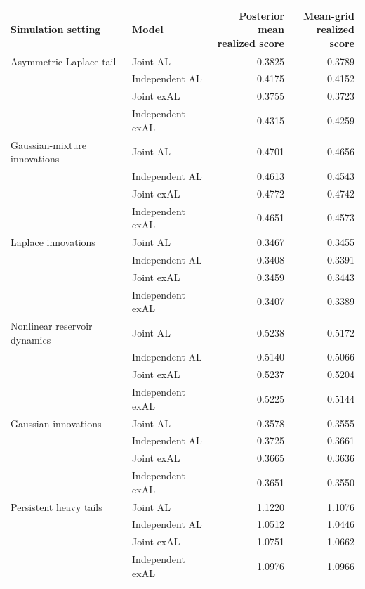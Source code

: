 \begin{table}[p]
\centering
\footnotesize
\setlength{\tabcolsep}{3pt}
\renewcommand{\arraystretch}{1.08}
\begin{tabular}{@{}>{\raggedright\arraybackslash}p{}>{\raggedright\arraybackslash}p{}rr@{}}
\toprule
Simulation setting & Model & \shortstack{Posterior mean\\realized score} & \shortstack{Mean-grid\\realized score} \\
\midrule
Asymmetric-Laplace tail & Joint AL & 0.3825 & 0.3789 \\
 & Independent AL & 0.4175 & 0.4152 \\
 & Joint exAL & 0.3755 & 0.3723 \\
 & Independent exAL & 0.4315 & 0.4259 \\
\addlinespace[2pt]
Gaussian-mixture innovations & Joint AL & 0.4701 & 0.4656 \\
 & Independent AL & 0.4613 & 0.4543 \\
 & Joint exAL & 0.4772 & 0.4742 \\
 & Independent exAL & 0.4651 & 0.4573 \\
\addlinespace[2pt]
Laplace innovations & Joint AL & 0.3467 & 0.3455 \\
 & Independent AL & 0.3408 & 0.3391 \\
 & Joint exAL & 0.3459 & 0.3443 \\
 & Independent exAL & 0.3407 & 0.3389 \\
\addlinespace[2pt]
Nonlinear reservoir dynamics & Joint AL & 0.5238 & 0.5172 \\
 & Independent AL & 0.5140 & 0.5066 \\
 & Joint exAL & 0.5237 & 0.5204 \\
 & Independent exAL & 0.5225 & 0.5144 \\
\addlinespace[2pt]
Gaussian innovations & Joint AL & 0.3578 & 0.3555 \\
 & Independent AL & 0.3725 & 0.3661 \\
 & Joint exAL & 0.3665 & 0.3636 \\
 & Independent exAL & 0.3651 & 0.3550 \\
\addlinespace[2pt]
Persistent heavy tails & Joint AL & 1.1220 & 1.1076 \\
 & Independent AL & 1.0512 & 1.0446 \\
 & Joint exAL & 1.0751 & 1.0662 \\
 & Independent exAL & 1.0976 & 1.0966 \\

\end{tabular}
\end{table}
